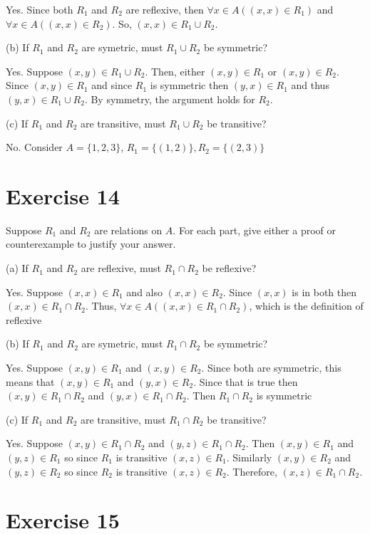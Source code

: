 \documentclass[11pt]{article}
\begin{document}
Yes. Since both $R_1$ and $R_2$ are reflexive, then 
$\forall x \in A ((x, x) \in R_1)$ and $\forall x \in A ((x, x) \in R_2)$.
So, $(x, x) \in R_1 \cup R_2$.

\noindent (b) If $R_1$ and $R_2$ are symetric, must $R_1 \cup R_2$ be symmetric?

Yes. Suppose $(x, y) \in R_1 \cup R_2$. Then, either $(x, y) \in R_1$ or 
$(x, y) \in R_2$. Since $(x, y) \in R_1$ and since $R_1$ is symmetric then 
$(y, x) \in R_1$ and thus $(y, x) \in R_1 \cup R_2$. By symmetry, the argument 
holds for $R_2$.

\noindent (c) If $R_1$ and $R_2$ are transitive, must $R_1 \cup R_2$ be transitive?

No. Consider $A = \{1, 2, 3\}$, $R_1 = \{(1, 2)\}, R_2 = \{(2, 3)\}$

\section*{Exercise 14}

Suppose $R_1$ and $R_2$ are relations on $A$. For each part, give either a 
proof or counterexample to justify your answer.

\noindent (a) If $R_1$ and $R_2$ are reflexive, must $R_1 \cap R_2$ be reflexive?

Yes. Suppose $(x, x) \in R_1$ and also $(x, x) \in R_2$. Since $(x, x)$ is in both
then $(x, x) \in R_1 \cap R_2$. Thus, $\forall x \in A ((x, x) \in R_1 \cap R_2)$,
which is the definition of reflexive


\noindent (b) If $R_1$ and $R_2$ are symetric, must $R_1 \cap R_2$ be symmetric?

Yes. Suppose $(x, y) \in R_1$ and $(x, y) \in R_2$. Since both are symmetric,
this means that $(x, y) \in R_1$ and $(y, x) \in R_2$. Since that is true then 
$(x, y) \in R_1 \cap R_2$ and $(y, x) \in R_1 \cap R_2$. Then $R_1 \cap R_2$
is symmetric

\noindent (c) If $R_1$ and $R_2$ are transitive, must $R_1 \cap R_2$ be transitive?

Yes. Suppose $(x, y) \in R_1 \cap R_2$ and $(y, z) \in R_1 \cap R_2$. Then 
$(x, y) \in R_1$ and $(y, z) \in R_1$ so since $R_1$ is transitive $(x, z) \in R_1$.
Similarly $(x, y) \in R_2$ and $(y, z) \in R_2$ so since $R_2$ is transitive
$(x, z) \in R_2$. Therefore, $(x, z) \in R_1 \cap R_2$.

\section*{Exercise 15}
\end{document}
